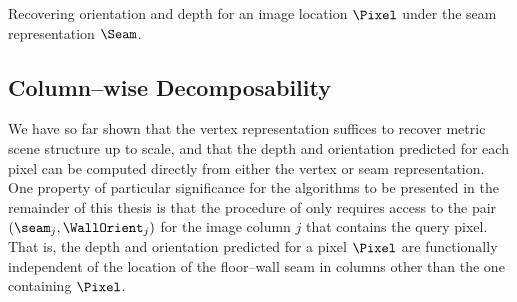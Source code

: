 \begin{algorithm}[tb]
  \begin{algorithmic}
    \STATE{}
    \ELSE
    \ENDIF
  \end{algorithmic}
  \caption{\label{alg:seam-depth-orient}
    Recovering orientation and depth for an
    image location $\Pixel$ under the seam representation $\Seam$.}
\end{algorithm}

\subsection{Column--wise Decomposability}
\label{sec:col-decomposability}

We have so far shown that the vertex representation suffices to
recover metric scene structure up to scale, and that the depth and
orientation predicted for each pixel can be computed directly from
either the vertex or seam representation. One property of particular
significance for the algorithms to be presented in the remainder of
this thesis is that the procedure of  only
requires access to the pair $(\seam_j,\WallOrient_j)$ for the image
column $j$ that contains the query pixel. That is, the depth and
orientation predicted for a pixel $\Pixel$ are functionally
independent of the location of the floor--wall seam in columns other
than the one containing $\Pixel$.

